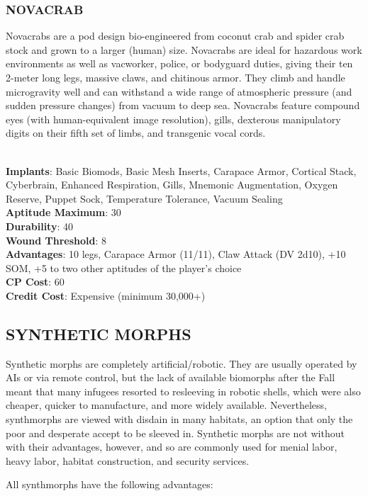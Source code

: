 \subsubsection{NOVACRAB}
Novacrabs are a pod design bio-engineered from coconut crab and spider crab
stock and grown to a larger (human) size. Novacrabs are ideal for hazardous
work environments as well as vacworker, police, or bodyguard duties, giving
their ten 2-meter long legs, massive claws, and chitinous armor. They climb and
handle microgravity well and can withstand a wide range of atmospheric pressure
(and sudden pressure changes) from vacuum to deep sea. Novacrabs feature
compound eyes (with human-equivalent image resolution), gills, dexterous
manipulatory digits on their fifth set of limbs, and transgenic vocal cords.

\\ \textbf{Implants}: Basic Biomods, Basic Mesh Inserts, Carapace Armor, Cortical Stack, Cyberbrain, Enhanced Respiration, Gills, Mnemonic Augmentation, Oxygen Reserve, Puppet Sock, Temperature Tolerance, Vacuum Sealing
\\ \textbf{Aptitude Maximum}: 30
\\ \textbf{Durability}: 40
\\ \textbf{Wound Threshold}: 8
\\ \textbf{Advantages}: 10 legs, Carapace Armor (11/11), Claw Attack (DV 2d10), +10 SOM, +5 to two other aptitudes of the player’s choice
\\ \textbf{CP Cost}: 60
\\ \textbf{Credit Cost}: Expensive (minimum 30,000+)

\subsection{SYNTHETIC MORPHS}

Synthetic morphs are completely artificial/robotic.  They are usually operated
by AIs or via remote control, but the lack of available biomorphs after the
Fall meant that many infugees resorted to resleeving in robotic shells, which
were also cheaper, quicker to manufacture, and more widely
available. Nevertheless, synthmorphs are viewed with disdain in many habitats,
an option that only the poor and desperate accept to be sleeved in. Synthetic
morphs are not without with their advantages, however, and so are commonly used
for menial labor, heavy labor, habitat construction, and security services.

All synthmorphs have the following advantages:

